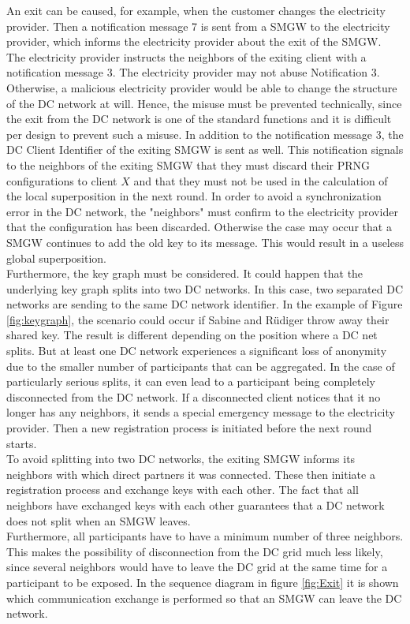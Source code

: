\begin{figure}[tbp]
\end{figure}An exit can be caused, for example, when the customer changes the electricity provider. Then a notification message 7 is sent from a \gls{SMGW} to the electricity provider, which informs the electricity provider about the exit of the \gls{SMGW}. The electricity provider instructs the neighbors of the exiting client with a notification message 3. The electricity provider may not abuse Notification 3. Otherwise, a malicious electricity provider would be able to change the structure of the DC network at will. Hence, the misuse must be prevented technically, since the exit from the DC network is one of the standard functions and it is difficult per design to prevent such a misuse. In addition to the notification message 3, the DC Client Identifier of the exiting \gls{SMGW} is sent as well. This notification signals to the neighbors of the exiting \gls{SMGW} that they must discard their \gls{PRNG} configurations to client $X$ and that they must not be used in the calculation of the local superposition in the next round. In order to avoid a synchronization error in the DC network, the "neighbors" must confirm to the electricity provider that the configuration has been discarded. Otherwise the case may occur that a \gls{SMGW} continues to add the old key to its message. This would result in a useless global superposition.\\ Furthermore, the key graph must be considered. It could happen that the underlying key graph splits into two DC networks. In this case, two separated DC networks are sending to the same DC network identifier. In the example of Figure \ref{fig:keygraph}, the scenario could occur if Sabine and Rüdiger throw away their shared key. The result is different depending on the position where a DC net splits. But at least one DC network experiences a significant loss of anonymity due to the smaller number of participants that can be aggregated. In the case of particularly serious splits, it can even lead to a participant being completely disconnected from the DC network. If a disconnected client notices that it no longer has any neighbors, it sends a special emergency message to the electricity provider. Then a new registration process is initiated before the next round starts.\\ To avoid splitting into two DC networks, the exiting \gls{SMGW} informs its neighbors with which direct partners it was connected. These then initiate a registration process and exchange keys with each other. The fact that all neighbors have exchanged keys with each other guarantees that a DC network does not split when an \gls{SMGW} leaves.\\ Furthermore, all participants have to have a minimum number of three neighbors. This makes the possibility of disconnection from the DC grid much less likely, since several neighbors would have to leave the DC grid at the same time for a participant to be exposed. In the sequence diagram in figure \ref{fig:Exit} it is shown which communication exchange is performed so that an \gls{SMGW} can leave the DC network.
